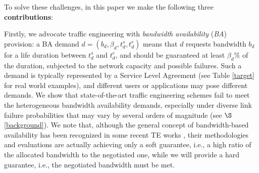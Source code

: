 \documentclass[sigconf]{acmart}
\begin{document}


To solve these challenges, in this paper we make the following  three \textbf{contributions}:



Firstly, we advocate traffic engineering with \textit{bandwidth availability} (\textit{BA}) provision: 
 a BA demand $d=(b_d, \beta_d, t_d^s, t_d^e)$ means that  $d$ requests bandwidth $b_d$ for a life duration between $ t_d^s$ and $t_d^e$, and should be guaranteed at least $\beta_d\%$ of the duration, subjected to the network capacity and possible failures. Such a demand is typically represented by a Service Level Agreement (see Table \ref{target} for real world examples), and different users or applications may pose different demands. 
We show that state-of-the-art traffic engineering schemes fail to meet the heterogeneous bandwidth  availability demands, especially under diverse link failure probabilities that may vary by several orders of magnitude (see $\S$\ref{background}). We note that, although the general concept of bandwidth-based availability has been recognized in some recent TE works \cite{hong2018b4,bwe, B4}, their methodologies and evaluations are actually achieving only a soft guarantee, i.e., a high ratio of the allocated bandwidth to the negotiated one, while we will provide a hard guarantee, i.e., the negotiated bandwidth must be met.
\end{document}
